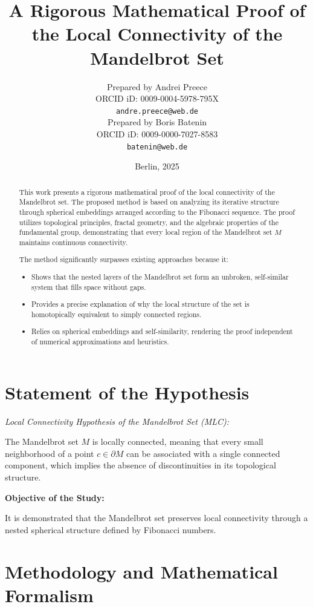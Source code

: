 \documentclass[12pt]{article}
\title{A Rigorous Mathematical Proof of\\
the Local Connectivity of the\\
Mandelbrot Set}
\author{Prepared by Andrei Preece\\
ORCID iD: 0009-0004-5978-795X\\
\texttt{andre.preece@web.de}\\[1em]
Prepared by Boris Batenin\\
ORCID iD: 0009-0000-7027-8583\\
\texttt{batenin@web.de}}
\date{Berlin, 2025}
\begin{document}
\maketitle
\newpage

\begin{abstract}
This work presents a rigorous mathematical proof of the local connectivity of the Mandelbrot set. The proposed method is based on analyzing its iterative structure through spherical embeddings arranged according to the Fibonacci sequence. The proof utilizes topological principles, fractal geometry, and the algebraic properties of the fundamental group, demonstrating that every local region of the Mandelbrot set \(M\) maintains continuous connectivity.

The method significantly surpasses existing approaches because it:
\begin{itemize}
\item Shows that the nested layers of the Mandelbrot set form an unbroken, self-similar system that fills space without gaps.
\item Provides a precise explanation of why the local structure of the set is homotopically equivalent to simply connected regions.
\item Relies on spherical embeddings and self-similarity, rendering the proof independent of numerical approximations and heuristics.
\end{itemize}
\end{abstract}

\section{Statement of the Hypothesis}

\textit{Local Connectivity Hypothesis of the Mandelbrot Set (MLC):}

The Mandelbrot set \(M\) is locally connected, meaning that every small neighborhood of a point \(c \in \partial M\) can be associated with a single connected component, which implies the absence of discontinuities in its topological structure.

\textbf{Objective of the Study:}

It is demonstrated that the Mandelbrot set preserves local connectivity through a nested spherical structure defined by Fibonacci numbers.

\section{Methodology and Mathematical Formalism}
\end{document}
